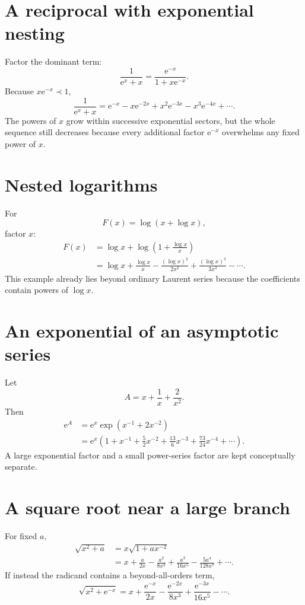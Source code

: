 \documentclass[11pt,openany]{book}
\theoremstyle{plain}
\theoremstyle{definition}
\theoremstyle{remark}
\newcommand{\e}{\mathrm{e}}
\begin{document}
\section{A reciprocal with exponential nesting}
Factor the dominant term:
\[
  \frac{1}{\e^x+x}
  =\frac{\e^{-x}}{1+x\e^{-x}}.
\]
Because $x\e^{-x}\prec1$,
\[
  \frac{1}{\e^x+x}
  =\e^{-x}-x\e^{-2x}+x^2\e^{-3x}
   -x^3\e^{-4x}+\cdots.
\]
The powers of $x$ grow within successive exponential sectors, but the whole sequence still decreases because every additional factor $\e^{-x}$ overwhelms any fixed power of $x$.

\section{Nested logarithms}
For
\[
  F(x)=\log(x+\log x),
\]
factor $x$:
\begin{align*}
  F(x)
  &=\log x+\log\left(1+\frac{\log x}{x}\right)\\
  &=\log x+\frac{\log x}{x}
    -\frac{(\log x)^2}{2x^2}
    +\frac{(\log x)^3}{3x^3}-\cdots.
\end{align*}
This example already lies beyond ordinary Laurent series because the coefficients contain powers of $\log x$.

\section{An exponential of an asymptotic series}
Let
\[
  A=x+\frac1x+\frac{2}{x^2}.
\]
Then
\begin{align*}
  \e^A
  &=\e^x\exp\left(x^{-1}+2x^{-2}\right)\\
  &=\e^x\left(
      1+x^{-1}+\frac{5}{2}x^{-2}
      +\frac{13}{6}x^{-3}
      +\frac{73}{24}x^{-4}+\cdots
    \right).
\end{align*}
A large exponential factor and a small power-series factor are kept conceptually separate.

\section{A square root near a large branch}
For fixed $a$,
\begin{align*}
 \sqrt{x^2+a}
 &=x\sqrt{1+ax^{-2}}\\
 &=x+\frac{a}{2x}-\frac{a^2}{8x^3}
   +\frac{a^3}{16x^5}
   -\frac{5a^4}{128x^7}+\cdots.
\end{align*}
If instead the radicand contains a beyond-all-orders term,
\[
  \sqrt{x^2+\e^{-x}}
  =x+\frac{\e^{-x}}{2x}
   -\frac{\e^{-2x}}{8x^3}
   +\frac{\e^{-3x}}{16x^5}-\cdots.
\]
\end{document}
